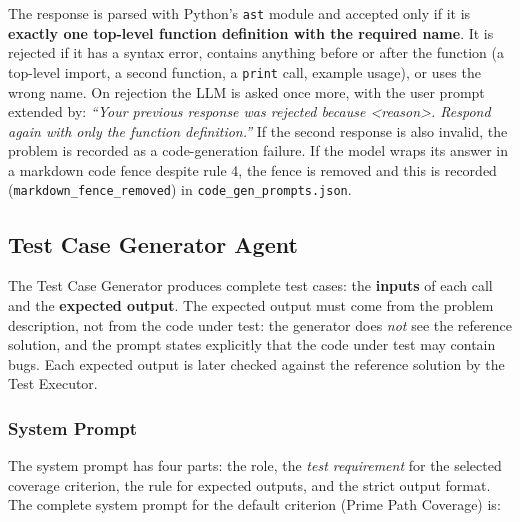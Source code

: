 \documentclass[12pt, a4paper]{article}
\begin{document}
The response is parsed with Python's \texttt{ast} module and accepted only if it is \textbf{exactly one top-level function definition with the required name}. It is rejected if it has a syntax error, contains anything before or after the function (a top-level import, a second function, a \texttt{print} call, example usage), or uses the wrong name. On rejection the LLM is asked once more, with the user prompt extended by: \emph{``Your previous response was rejected because \textless reason\textgreater. Respond again with only the function definition.''} If the second response is also invalid, the problem is recorded as a code-generation failure. If the model wraps its answer in a markdown code fence despite rule 4, the fence is removed and this is recorded (\texttt{markdown\_fence\_removed}) in \texttt{code\_gen\_prompts.json}.

\subsection{Test Case Generator Agent}
\label{sec:testgen}

The Test Case Generator produces complete test cases: the \textbf{inputs} of each call and the \textbf{expected output}. The expected output must come from the problem description, not from the code under test: the generator does \emph{not} see the reference solution, and the prompt states explicitly that the code under test may contain bugs. Each expected output is later checked against the reference solution by the Test Executor.

\subsubsection{System Prompt}

The system prompt has four parts: the role, the \emph{test requirement} for the selected coverage criterion, the rule for expected outputs, and the strict output format. The complete system prompt for the default criterion (Prime Path Coverage) is:
\end{document}
